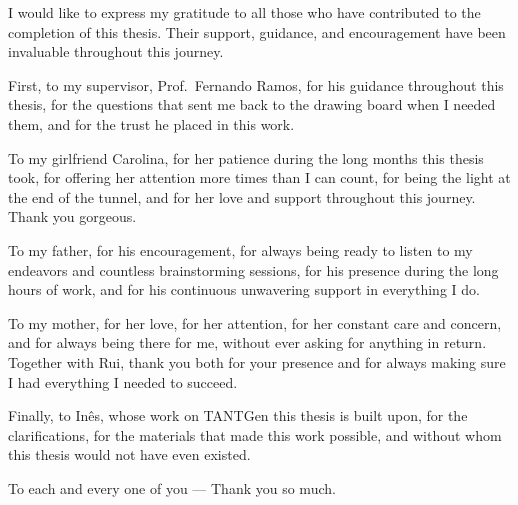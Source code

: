 
\noindent I would like to express my gratitude to all those who have contributed to the completion of this thesis. Their support, guidance, and encouragement have been invaluable throughout this journey.

First, to my supervisor, Prof.\ Fernando Ramos, for
his guidance throughout this thesis, for the questions that sent me back to the
drawing board when I needed them, and for the trust he placed in this work.

To my girlfriend Carolina,
for her patience during the long months this thesis took, for offering her attention
more times than I can count, for being the light at the end of the tunnel,
and for her love and support throughout this journey.
Thank you gorgeous.

To my father,
for his encouragement, for always being ready to listen to my endeavors and
countless brainstorming sessions, for his presence during the long hours of work, and for his continuous unwavering support in everything I do.

To my mother,
for her love, for her attention, for her constant care and concern, and for always being there for me, without ever asking for anything in return.
Together with Rui, thank you both
for your presence and for always making sure I had everything I
needed to succeed.

Finally, to In\^{e}s,
whose work on TANTGen this thesis is built upon, for the clarifications, for the
materials that made this work possible, and without whom this thesis would not have even existed.

To each and every one of you --- Thank you so much.
